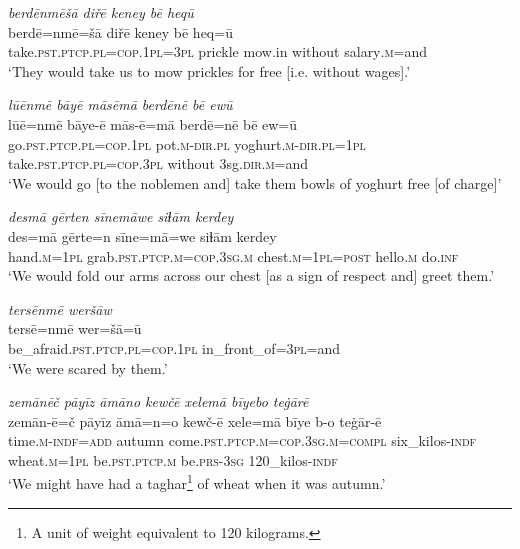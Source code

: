 \ea \label{RE.66}
\textit{berdēnmēšā diřē keney bē heqū} \\ 
\gll berdē=nmē=šā diřē keney bē heq=ū \\ 
 take\textsc{.pst}\textsc{.ptcp}\textsc{.pl}\textsc{=cop}\textsc{.\textsc{1pl}}\textsc{=3pl} prickle mow.in without salary\textsc{.m}=and \\ 
\glt `They would take us to mow prickles for free [i.e. without wages].'
\z 
 
\ea \label{RE.67}
\textit{lūēnmē bāyē māsēmā berdēnē bē ewū} \\ 
\gll lūē=nmē bāye-ē mās-ē=mā berdē=nē bē ew=ū \\ 
 go\textsc{.pst}\textsc{.ptcp}\textsc{.pl}\textsc{=cop}\textsc{.\textsc{1pl}} pot\textsc{.m}\textsc{-dir}\textsc{.pl} yoghurt\textsc{.m}\textsc{-dir}\textsc{.pl}\textsc{=\textsc{1pl}} take\textsc{.pst}\textsc{.ptcp}\textsc{.pl}\textsc{=cop}\textsc{.3pl} without 3sg\textsc{.dir}\textsc{.m}=and \\ 
\glt `We would go [to the noblemen and] take them bowls of yoghurt free [of charge]'
\z 
 
\ea \label{RE.68}
\textit{desmā gērten sīnemāwe siɫām kerdey} \\ 
\gll des=mā gērte=n sīne=mā=we siɫām kerdey \\ 
 hand\textsc{.m}\textsc{=\textsc{1pl}} grab\textsc{.pst}\textsc{.ptcp}\textsc{.m}\textsc{=cop}\textsc{.3sg}\textsc{.m} chest\textsc{.m}\textsc{=\textsc{1pl}}\textsc{=\textsc{post}} hello\textsc{.m} do\textsc{.inf} \\ 
\glt `We would fold our arms across our chest [as a sign of respect and] greet them.'
\z 
 
\ea \label{RE.69}
\textit{tersēnmē weršāw} \\ 
\gll tersē=nmē wer=šā=ū \\ 
 be\_afraid\textsc{.pst}\textsc{.ptcp}\textsc{.pl}\textsc{=cop}\textsc{.\textsc{1pl}} in\_front\_of\textsc{=3pl}=and \\ 
\glt `We were scared by them.'
\z 
 
\ea \label{RE.70}
\textit{zemānēč pāyīz āmāno kewčē xelemā bīyebo teġārē} \\ 
\gll zemān-ē=č pāyīz āmā=n=o kewč-ē xele=mā bīye b-o teġār-ē \\ 
 time\textsc{.m}\textsc{-indf}\textsc{=add} autumn come\textsc{.pst}\textsc{.ptcp}\textsc{.m}\textsc{=cop}\textsc{.3sg}\textsc{.m}\textsc{=compl} six\_kilos\textsc{-indf} wheat\textsc{.m}\textsc{=\textsc{1pl}} be\textsc{.pst}\textsc{.ptcp}\textsc{.m} be\textsc{.prs}\textsc{-3sg} 120\_kilos\textsc{-indf} \\ 
\glt `We might have had a taghar\footnote{A unit of weight equivalent to 120 kilograms.} of wheat when it was autumn.'
\z 
 
